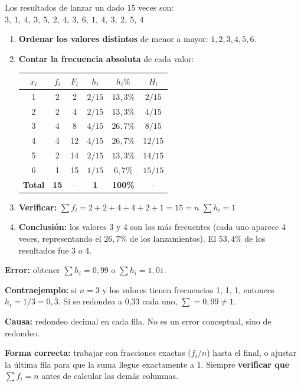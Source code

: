 \documentclass[11pt, letterpaper]{article}
\begin{document}
\begin{tcolorbox}[examplebox, title={Ej. 3. Construir una tabla de frecuencias para datos no agrupados}]
Los resultados de lanzar un dado 15 veces son:
$3,\ 1,\ 4,\ 3,\ 5,\ 2,\ 4,\ 3,\ 6,\ 1,\ 4,\ 3,\ 2,\ 5,\ 4$

\begin{enumerate}[label=\textbf{Paso \arabic*.}]
  \item \textbf{Ordenar los valores distintos} de menor a mayor: $1, 2, 3, 4, 5, 6$.
  \medskip
  \item \textbf{Contar la frecuencia absoluta} de cada valor:
  \begin{center}
  \renewcommand{\arraystretch}{1.3}
  \begin{tabular}{c c c c c c}
  \toprule
  $x_i$ & $f_i$ & $F_i$ & $h_i$ & $h_i\%$ & $H_i$\\
  \midrule
  1 & 2 & 2  & $2/15$ & $13{,}3\%$ & $2/15$\\
  2 & 2 & 4  & $2/15$ & $13{,}3\%$ & $4/15$\\
  3 & 4 & 8  & $4/15$ & $26{,}7\%$ & $8/15$\\
  4 & 4 & 12 & $4/15$ & $26{,}7\%$ & $12/15$\\
  5 & 2 & 14 & $2/15$ & $13{,}3\%$ & $14/15$\\
  6 & 1 & 15 & $1/15$ & $6{,}7\%$  & $15/15$\\
  \midrule
  \textbf{Total} & \textbf{15} & -- & \textbf{1} & \textbf{100\%} & --\\
  \bottomrule
  \end{tabular}
  \end{center}
  \medskip
  \item \textbf{Verificar:} $\sum f_i = 2+2+4+4+2+1 = 15 = n$ \checkmark \quad $\sum h_i = 1$ \checkmark
  \medskip
  \item \textbf{Conclusi\'on:} los valores 3 y 4 son los m\'as frecuentes (cada uno aparece 4 veces, representando el $26{,}7\%$ de los lanzamientos). El $53{,}4\%$ de los resultados fue 3 o 4.
\end{enumerate}
\end{tcolorbox}

\begin{tcolorbox}[warningbox, title={Error frecuente: frecuencias relativas que no suman 1}]
\textbf{Error:} obtener $\sum h_i = 0{,}99$ o $\sum h_i = 1{,}01$.

\medskip
\textbf{Contraejemplo:} si $n=3$ y los valores tienen frecuencias 1, 1, 1, entonces $h_i = 1/3 = 0{,}\overline{3}$. Si se redondea a 0{,}33 cada uno, $\sum = 0{,}99 \neq 1$.

\medskip
\textbf{Causa:} redondeo decimal en cada fila. No es un error conceptual, sino de redondeo.

\medskip
\textbf{Forma correcta:} trabajar con fracciones exactas ($f_i/n$) hasta el final, o ajustar la \'ultima fila para que la suma llegue exactamente a 1. Siempre \textbf{verificar que $\sum f_i = n$} antes de calcular las dem\'as columnas.
\end{tcolorbox}
\end{document}
